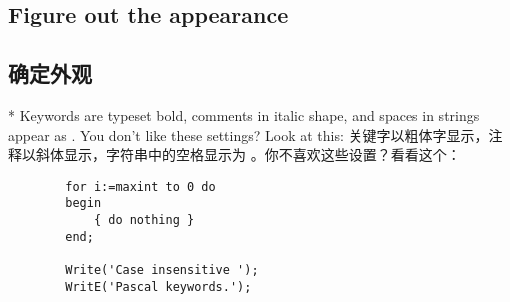 \begin{paracol}{2}
\subsection{Figure out the appearance}\label{gFigureOutTheAppearance}
\switchcolumn
\subsection{确定外观}
\switchcolumn[0]*%
Keywords are typeset bold, comments in italic shape, and spaces in strings
appear as \textvisiblespace. You don't like these settings? Look at this:
\switchcolumn
关键字以粗体字显示，注释以斜体显示，字符串中的空格显示为 \textvisiblespace 。你不喜欢这些设置？看看这个：

\ifcolor
\begin{lstxsample}
\end{lstxsample}
\else
\begin{lstxsample}
            \lstset{%
            basicstyle=\small,          %
            keywordstyle=\bfseries\underbar,
            identifierstyle=,           %
            commentstyle=\itshape,      %
            stringstyle=\ttfamily,      %
            showstringspaces=false}     %
\end{lstxsample}
\fi
\begin{lstsample}{}{}
        \begin{lstlisting}
        for i:=maxint to 0 do
        begin
            { do nothing }
        end;

        Write('Case insensitive ');
        WritE('Pascal keywords.');
        \end{lstlisting}
\end{lstsample}
\end{paracol}


